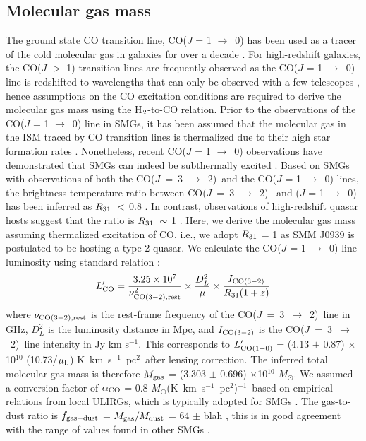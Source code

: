 \documentclass[twocolumn,apj,numberedappendix]{emulateapj}
\newcommand{\Msun}{\mbox{$M_{\odot}$}}
\newcommand{\rarr}{$\rightarrow$}
\newcommand{\CO}{\mbox{CO($J$ = 3 $\rightarrow$ 2) }}
\newcommand{\LpU}{\mbox{K km s$^{-1}$ pc$^2$}}
\newcommand{\eg}{{\sl e.g.,~}}
\newcommand{\pmOne}{$^{-1}$}
\begin{document}
\subsection{Molecular gas mass}
The ground state CO transition line, CO($J$ = 1 \rarr\ 0) has been used as a tracer of the cold molecular gas in galaxies for 
over a decade \citep*[\eg][]{Downes98a,Wilson70a}. For high-redshift galaxies, the CO($J$ $>$ 1) transition lines are frequently observed as
 the CO($J$ = 1 \rarr\ 0) line is redshifted to wavelengths that can only be observed with a few telescopes \citep{Carilli13a}, 
 hence assumptions on the CO excitation conditions are required to derive the molecular gas mass using the H$_{\rm 2}$-to-CO 
 relation. Prior to the observations of the CO($J$ = 1 \rarr\ 0) line in SMGs, it has been assumed that the molecular gas in the
  ISM traced by CO transition lines is thermalized due to their high star formation rates \citep[\eg][]{Greve05a, Coppin08a}.
   Nonetheless, recent CO($J$ = 1 \rarr\ 0) observations have demonstrated that SMGs can indeed be subthermally excited
   \citep{Harris10a,Riechers11c,Riechers11d,Ivison11a}. Based on SMGs with observations of both the \CO and the CO($J$ = 1 \rarr\ 0) lines, the 
   brightness temperature ratio between \CO
and ($J$ = 1 \rarr\ 0) has been inferred as $R_{\rm 31}\ <$ 0.8 \citep
   {Harris10a,Carilli10a,Swinbank2010a,Riechers11d,Ivison11a,Ivison10d}. In contrast, observations of high-redshift quasar hosts suggest that the ratio 
   is $R_{\rm 31}\ \sim\ $1 \citep{Riechers06a, Riechers11a, Scott11a}. 
Here, we derive the molecular gas mass assuming thermalized excitation of CO, i.e., we adopt $R_{\rm 31}$ = 1 as SMM J0939 is 
postulated to be hosting a type-2 quasar. We calculate the CO($J$ = 1 \rarr\ 0) line luminosity using standard relation 
\citep[\eg][]{Solomon05a,Carilli13a}:
\begin{equation}
L^{\prime}_{\rm CO} = \frac{3.25\times10^7}{\nu_{\rm CO (3-2), rest}^2}\times \frac{D_L^2}{\mu} \times
\frac{I_{\rm CO(3-2)}} {R_{\rm 31} (1 + z)}
\end{equation}
where $\nu_{\rm CO (3-2), rest}$ is the rest-frame frequency of the \CO line in GHz, $D_L^2$ is the luminosity distance in Mpc, and $I_{\rm CO(3-2)}$ is the \CO line intensity in Jy km s\pmOne. This corresponds to $L^{\prime}_{\rm CO (1-0)}$ = (4.13 $\pm$ 0.87) $\times$ 10$^{10}$ (10.73/$\mu_{\rm L}$) \LpU\ after lensing correction. The inferred total molecular gas mass is therefore $M_{\rm gas}$ = (3.303 $\pm$ 0.696) $\times
$10$^{10}$ \Msun. We assumed a conversion factor of $\alpha_{\rm CO}$ =
0.8 \Msun (\LpU)\pmOne\ based on empirical relations from local ULIRGs, which is typically
adopted for SMGs \citep[\eg][]{Tacconi06a,Tacconi08a,Bothwell13a}. 
The gas-to-dust
ratio is $f_{\rm gas-dust}$ = $M_{\rm gas}/M_{\rm dust}$ = 64 $\pm$ blah , this is in good agreement with the range 
of values found in other SMGs \citep{Coppin08a,Micha10a,Riechers11c}.
\end{document}
